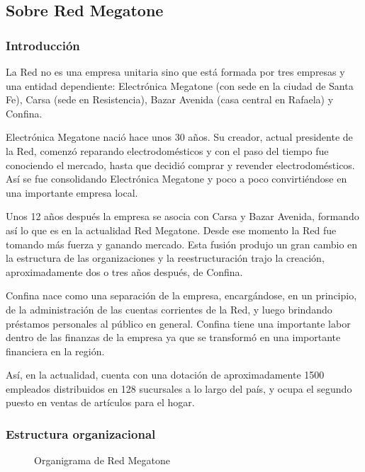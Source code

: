 \subsection{Sobre Red Megatone}


\subsubsection{Introducción}

La Red no es una empresa unitaria sino que está formada por tres empresas y una
entidad dependiente: Electrónica Megatone (con sede en la ciudad de Santa Fe),
Carsa (sede en Resistencia), Bazar Avenida (casa central en Rafaela) y Confina.

Electrónica Megatone nació hace unos 30 años. Su creador, actual presidente de
la Red, comenzó reparando electrodomésticos y con el paso del tiempo fue
conociendo el mercado, hasta que decidió comprar y revender electrodomésticos.
Así se fue consolidando Electrónica Megatone y poco a poco convirtiéndose en
una importante empresa local. 

Unos 12 años después la empresa se asocia con Carsa y Bazar Avenida, formando
así lo que es en la actualidad Red Megatone. Desde ese momento la Red fue
tomando más fuerza y ganando mercado. Esta fusión produjo un gran cambio en la
estructura de las organizaciones y la reestructuración trajo la creación,
aproximadamente dos o tres años después, de Confina.

Confina nace como una separación de la empresa, encargándose, en un principio,
de la administración de las cuentas corrientes de la Red, y luego brindando
préstamos personales al público en general. Confina tiene una importante labor
dentro de las finanzas de la empresa ya que se transformó en una importante
financiera en la región.

Así, en la actualidad, cuenta con una dotación de aproximadamente 1500
empleados distribuidos en 128 sucursales a lo largo del país, y ocupa el
segundo puesto en ventas de artículos para el hogar.


\subsubsection{Estructura organizacional}

\begin{figure}[h]
  \caption{Organigrama de Red Megatone}
  \label{fig:organigrama}
\end{figure}

